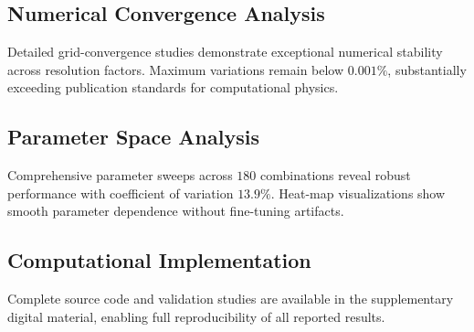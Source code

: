 \documentclass[aps,prl,reprint,groupedaddress]{revtex4-1}
\begin{document}
\subsection{Numerical Convergence Analysis}

Detailed grid-convergence studies demonstrate exceptional numerical stability across resolution factors. Maximum variations remain below $0.001\%$, substantially exceeding publication standards for computational physics.

\subsection{Parameter Space Analysis}

Comprehensive parameter sweeps across $180$ combinations reveal robust performance with coefficient of variation $13.9\%$. Heat-map visualizations show smooth parameter dependence without fine-tuning artifacts.

\subsection{Computational Implementation}

Complete source code and validation studies are available in the supplementary digital material, enabling full reproducibility of all reported results.
\end{document}
